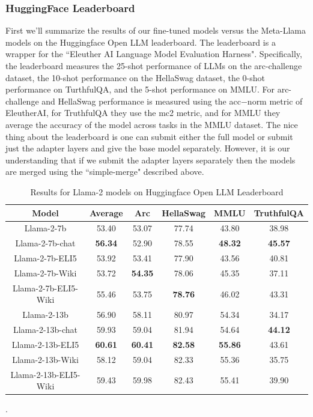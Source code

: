 \documentclass[11pt, oneside]{article}   	%
\begin{document}
\subsubsection{HuggingFace Leaderboard}
First we'll summarize the results of our fine-tuned models versus the Meta-Llama models on the Huggingface Open LLM leaderboard.
The leaderboard is a wrapper for the ``Eleuther AI Language Model Evaluation Harness". 
Specifically, the leaderboard measures the 25-shot performance of LLMs on the arc-challenge dataset, the 10-shot performance on the HellaSwag dataset, the 0-shot performance on TurthfulQA, and the 5-shot performance on MMLU. 
For arc-challenge and HellaSwag performance is measured using the acc$-$norm metric of EleutherAI, for TruthfulQA they use the mc2 metric, and for MMLU they average the accuracy of the model across tasks in the MMLU dataset.
The nice thing about the leaderboard is one can submit either the full model or submit just the adapter layers and give the base model separately.
However, it is our understanding that if we submit the adapter layers separately then the models are merged using the ``simple-merge" described above.
\begin{table}[h]
\begin{center}
\begin{tabular}{|c|c|c|c|c|c|}
\hline
Model &          Average & Arc & HellaSwag & MMLU & TruthfulQA \\
\hline
Llama-2-7b&                  53.40               &   53.07            & 77.74              &  43.80                &  38.98 \\
Llama-2-7b-chat  &          \textbf{56.34} &  52.90              & 78.55             &  \textbf{48.32}    &  \textbf{45.57} \\
Llama-2-7b-ELI5  &           53.92             &  53.41              & 77.90             &  43.56                 & 40.81\\
Llama-2-7b-Wiki &           53.72              &  \textbf{54.35} & 78.06             &  45.35                 & 37.11\\
Llama-2-7b-ELI5-Wiki&    55.46               &  53.75              & \textbf{78.76}&  46.02                   & 43.31\\
\hhline{|=|=|=|=|=|=|}
Llama-2-13b &               56.90              &   58.11             & 80.97            &  54.34            & 34.17\\
Llama-2-13b-chat&        59.93              & 59.04               & 81.94            &  54.64            & \textbf{44.12}\\
Llama-2-13b-ELI5&          \textbf{60.61} &  \textbf{60.41}  & \textbf{82.58}&  \textbf{55.86}& 43.61\\
Llama-2-13b-Wiki&	        58.12             &  59.04               & 82.33            &  55.36            & 35.75\\
Llama-2-13b-ELI5-Wiki&   59.43             &  59.98               & 82.43            &  55.41            & 39.90 \\
\hline
\end{tabular}
\end{center}
\caption{Results for Llama-2 models on Huggingface Open LLM Leaderboard}.
\label{table:hfleaderboard}
\end{table}
\end{document}

